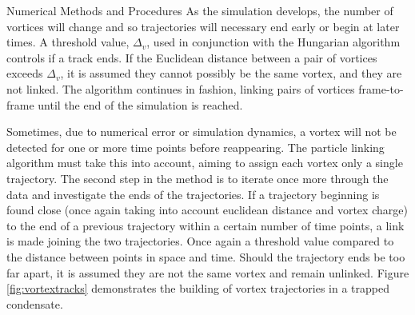 \begin{chapter}{\label{cha:numerics}Numerical Methods and Procedures}
As the simulation develops, the number of vortices will change and so trajectories will necessary end early or begin at later times. A threshold value, $\Delta_v$, used in conjunction with the Hungarian algorithm controls if a track ends. If the Euclidean distance between a pair of vortices exceeds $\Delta_v$, it is assumed they cannot possibly be the same vortex, and they are not linked. The algorithm continues in fashion, linking pairs of vortices frame-to-frame until the end of the simulation is reached.

Sometimes, due to numerical error or simulation dynamics, a vortex will not be detected for one or more time points before reappearing. The particle linking algorithm must take this into account, aiming to assign each vortex only a single trajectory. The second step in the method is to iterate once more through the data and investigate the ends of the trajectories. If a trajectory beginning is found close (once again taking into account euclidean distance and vortex charge) to the end of a previous trajectory within a certain number of time points, a link is made joining the two trajectories. Once again a threshold value compared to the distance between points in space and time. Should the trajectory ends be too far apart, it is assumed they are not the same vortex and remain unlinked. Figure \ref{fig:vortextracks} demonstrates the building of vortex trajectories in a trapped condensate.
\begin{figure}
\begin{center}
\end{center}
\end{figure}
\end{chapter}
